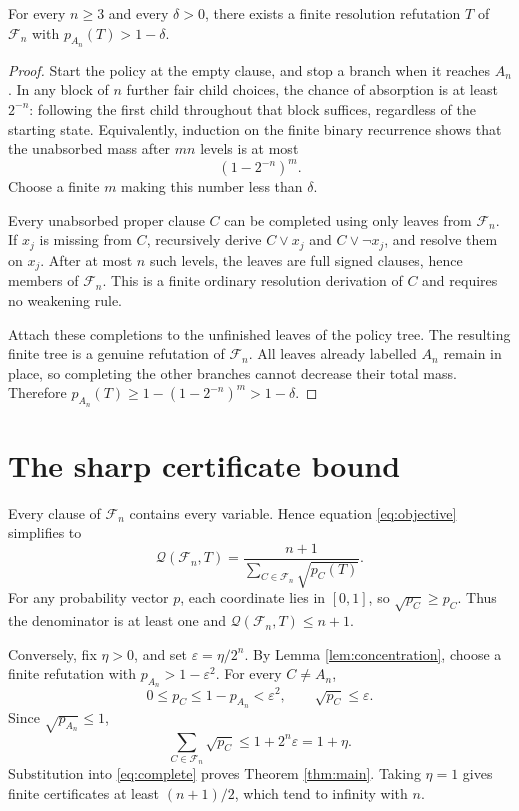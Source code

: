 \documentclass[11pt]{article}
\newcommand{\Q}{\mathcal Q}\newcommand{\F}{\mathcal F}
\begin{document}
\begin{lemma}\label{lem:concentration}
For every $n\ge3$ and every $\delta>0$, there exists a finite resolution refutation $T$ of $\F_n$ with $p_{A_n}(T)>1-\delta$.
\end{lemma}
\begin{proof}
Start the policy at the empty clause, and stop a branch when it reaches $A_n$. In any block of $n$ further fair child choices, the chance of absorption is at least $2^{-n}$: following the first child throughout that block suffices, regardless of the starting state. Equivalently, induction on the finite binary recurrence shows that the unabsorbed mass after $mn$ levels is at most
\[
 (1-2^{-n})^m.
\]
Choose a finite $m$ making this number less than $\delta$.

Every unabsorbed proper clause $C$ can be completed using only leaves from $\F_n$. If $x_j$ is missing from $C$, recursively derive $C\vee x_j$ and $C\vee\neg x_j$, and resolve them on $x_j$. After at most $n$ such levels, the leaves are full signed clauses, hence members of $\F_n$. This is a finite ordinary resolution derivation of $C$ and requires no weakening rule.

Attach these completions to the unfinished leaves of the policy tree. The resulting finite tree is a genuine refutation of $\F_n$. All leaves already labelled $A_n$ remain in place, so completing the other branches cannot decrease their total mass. Therefore
$p_{A_n}(T)\ge1-(1-2^{-n})^m>1-\delta$.
\end{proof}

\section{The sharp certificate bound}
Every clause of $\F_n$ contains every variable. Hence equation \eqref{eq:objective} simplifies to
\begin{equation}\label{eq:complete}
 \Q(\F_n,T)=\frac{n+1}{\sum_{C\in\F_n}\sqrt{p_C(T)}}.
\end{equation}
For any probability vector $p$, each coordinate lies in $[0,1]$, so $\sqrt{p_C}\ge p_C$. Thus the denominator is at least one and $\Q(\F_n,T)\le n+1$.

Conversely, fix $\eta>0$, and set $\varepsilon=\eta/2^n$. By Lemma \ref{lem:concentration}, choose a finite refutation with $p_{A_n}>1-\varepsilon^2$. For every $C\ne A_n$,
\[
 0\le p_C\le1-p_{A_n}<\varepsilon^2,
 \qquad \sqrt{p_C}\le\varepsilon.
\]
Since $\sqrt{p_{A_n}}\le1$,
\[
 \sum_{C\in\F_n}\sqrt{p_C}\le1+2^n\varepsilon=1+\eta.
\]
Substitution into \eqref{eq:complete} proves Theorem \ref{thm:main}. Taking $\eta=1$ gives finite certificates at least $(n+1)/2$, which tend to infinity with $n$.
\end{document}
